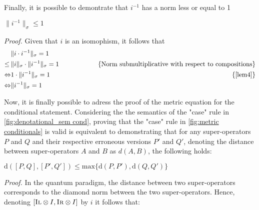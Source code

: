   
Finally, it is possible to demontrate that $i^{-1}$ has a norm less or equal to 1

\begin{lemma} \label{lem4}
  $  \lVert i^{-1}  \rVert_{\sigma} \leq 1 $
\end{lemma}

\textit{Proof.} \quad Given that $i$ is an isomophism, it follows that 
\begin{equation} 
  \begin{split}
    &\lVert i \cdot i^{-1}  \rVert_{\sigma} = 1  \\
    \leq \hspace{2pt}& \lVert i  \rVert_{\sigma} \cdot \lVert i^{-1}  \rVert_{\sigma} = 1 \hspace{50pt} & \text{\{Norm submultiplicative with respect to compositions\}} \\
    \Leftrightarrow & 1 \cdot \lVert i^{-1}  \rVert_{\sigma} = 1 & \text{\{\autoref{lem4}\}}  \\
    \Leftrightarrow &  \lVert i^{-1}  \rVert_{\sigma} = 1  \\
  \end{split}   
  \end{equation}




Now, it is finally possible to adress the proof of the metric equation for the conditional statement. Considering the the semantics of the "case" rule in \autoref{fig:denotational_sem cond}, proving that the "case" rule in \autoref{fig:metric conditionals} is valid is equivalent to demonstrating that for any super-operators $P$ and $Q$ and their respective erroneous versions $P'$ and $Q'$, denoting the distance between super-operators $A$ and $B$ as $d(A,B)$,  the following holds:
\begin{theorem} \label {theorem:1.1}
  $\text{d} ([P,Q],[P',Q']) \leq \text{max} \{\text{d} (P,P'),\text{d} (Q,Q')\}$
\end{theorem}
\vspace{10pt}
\textit {Proof.} 
In the quantum paradigm, the distance between two super-operators  corresponds to the diamond norm between the two super-operators. Hence, denoting $ [\textsc{Il} \otimes I, \textsc{Ir} \otimes I ]$ by $i$ it follows that:


